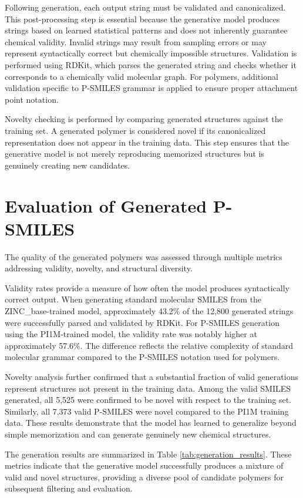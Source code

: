 Following generation, each output string must be validated and canonicalized. This post-processing step is essential because the generative model produces strings based on learned statistical patterns and does not inherently guarantee chemical validity. Invalid strings may result from sampling errors or may represent syntactically correct but chemically impossible structures. Validation is performed using RDKit, which parses the generated string and checks whether it corresponds to a chemically valid molecular graph. For polymers, additional validation specific to P-SMILES grammar is applied to ensure proper attachment point notation.

Novelty checking is performed by comparing generated structures against the training set. A generated polymer is considered novel if its canonicalized representation does not appear in the training data. This step ensures that the generative model is not merely reproducing memorized structures but is genuinely creating new candidates.

\section{Evaluation of Generated P-SMILES}
\label{sec:evaluation_generation}

The quality of the generated polymers was assessed through multiple metrics addressing validity, novelty, and structural diversity.

Validity rates provide a measure of how often the model produces syntactically correct output. When generating standard molecular SMILES from the ZINC_base-trained model, approximately 43.2\% of the 12,800 generated strings were successfully parsed and validated by RDKit. For P-SMILES generation using the PI1M-trained model, the validity rate was notably higher at approximately 57.6\%. The difference reflects the relative complexity of standard molecular grammar compared to the P-SMILES notation used for polymers.

Novelty analysis further confirmed that a substantial fraction of valid generations represent structures not present in the training data. Among the valid SMILES generated, all 5,525 were confirmed to be novel with respect to the training set. Similarly, all 7,373 valid P-SMILES were novel compared to the PI1M training data. These results demonstrate that the model has learned to generalize beyond simple memorization and can generate genuinely new chemical structures.

The generation results are summarized in Table \ref{tab:generation_results}. These metrics indicate that the generative model successfully produces a mixture of valid and novel structures, providing a diverse pool of candidate polymers for subsequent filtering and evaluation.

